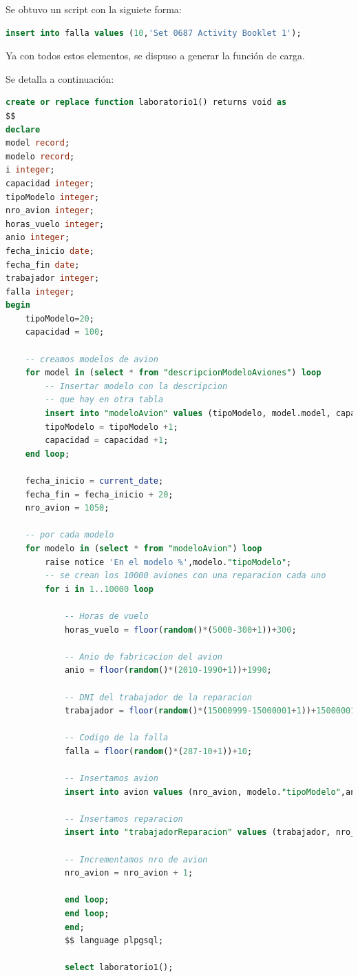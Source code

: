 \documentclass[12pt]{report}
\begin{document}
Se obtuvo un script con la siguiete forma:

\begin{lstlisting}[language=SQL]
insert into falla values (10,'Set 0687 Activity Booklet 1');
\end{lstlisting}

Ya con todos estos elementos, se dispuso a generar la función de carga.

Se detalla a continuación:

\begin{lstlisting}[language=SQL]
create or replace function laboratorio1() returns void as
$$
declare
model record;
modelo record;
i integer;
capacidad integer;
tipoModelo integer;
nro_avion integer;
horas_vuelo integer;
anio integer;
fecha_inicio date;
fecha_fin date;
trabajador integer;
falla integer;
begin
    tipoModelo=20;
    capacidad = 100;

    -- creamos modelos de avion
    for model in (select * from "descripcionModeloAviones") loop
        -- Insertar modelo con la descripcion 
        -- que hay en otra tabla
        insert into "modeloAvion" values (tipoModelo, model.model, capacidad);
        tipoModelo = tipoModelo +1;
        capacidad = capacidad +1;
    end loop;

    fecha_inicio = current_date;
    fecha_fin = fecha_inicio + 20;
    nro_avion = 1050;

    -- por cada modelo
    for modelo in (select * from "modeloAvion") loop
        raise notice 'En el modelo %',modelo."tipoModelo";
        -- se crean los 10000 aviones con una reparacion cada uno
        for i in 1..10000 loop

            -- Horas de vuelo
            horas_vuelo = floor(random()*(5000-300+1))+300;

            -- Anio de fabricacion del avion
            anio = floor(random()*(2010-1990+1))+1990;

            -- DNI del trabajador de la reparacion
            trabajador = floor(random()*(15000999-15000001+1))+15000001;

            -- Codigo de la falla
            falla = floor(random()*(287-10+1))+10;

            -- Insertamos avion
            insert into avion values (nro_avion, modelo."tipoModelo",anio, horas_vuelo);

            -- Insertamos reparacion
            insert into "trabajadorReparacion" values (trabajador, nro_avion, fecha_inicio, fecha_fin, falla);

            -- Incrementamos nro de avion
            nro_avion = nro_avion + 1;

            end loop;
            end loop;
            end;
            $$ language plpgsql;

            select laboratorio1();
\end{lstlisting}
\end{document}
